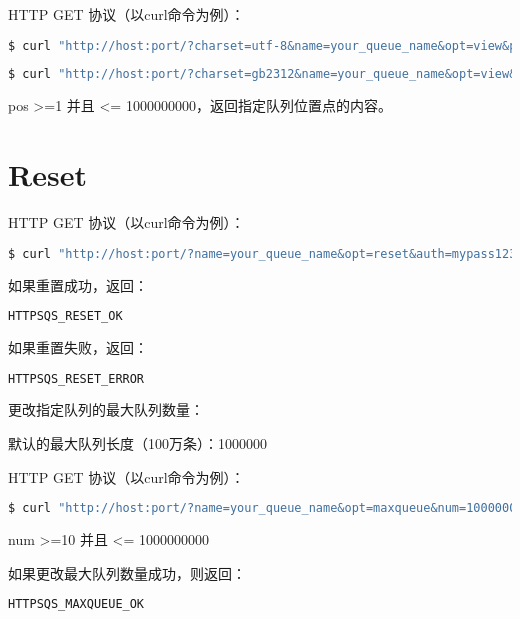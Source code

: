 HTTP GET 协议（以curl命令为例）：

\begin{lstlisting}[language=bash]
$ curl "http://host:port/?charset=utf-8&name=your_queue_name&opt=view&pos=5&auth=mypass123"
\end{lstlisting}





\begin{lstlisting}[language=bash]
$ curl "http://host:port/?charset=gb2312&name=your_queue_name&opt=view&pos=19&auth=mypass123"
\end{lstlisting}


pos >=1 并且 <= 1000000000，返回指定队列位置点的内容。

\section{Reset}

HTTP GET 协议（以curl命令为例）：


\begin{lstlisting}[language=bash]
$ curl "http://host:port/?name=your_queue_name&opt=reset&auth=mypass123"
\end{lstlisting}

如果重置成功，返回：


\begin{lstlisting}[language=bash]
HTTPSQS_RESET_OK
\end{lstlisting}

如果重置失败，返回：


\begin{lstlisting}[language=bash]
HTTPSQS_RESET_ERROR
\end{lstlisting}



更改指定队列的最大队列数量：

默认的最大队列长度（100万条）：1000000

HTTP GET 协议（以curl命令为例）：

\begin{lstlisting}[language=bash]
$ curl "http://host:port/?name=your_queue_name&opt=maxqueue&num=1000000000&auth=mypass123"
\end{lstlisting}

num >=10 并且 <= 1000000000

如果更改最大队列数量成功，则返回：

\begin{lstlisting}[language=bash]
HTTPSQS_MAXQUEUE_OK
\end{lstlisting}

